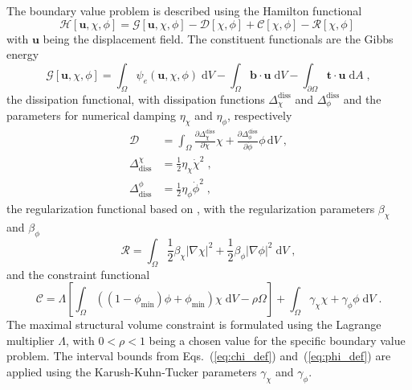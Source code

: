 \documentclass[
	pdflatex,
	sn-mathphys-num
]{sn-jnl}
\theoremstyle{thmstyleone}%
\theoremstyle{thmstyletwo}%
\theoremstyle{thmstylethree}%
\begin{document}
The boundary value problem is described using the Hamilton
functional
\begin{equation}
	\label{eq:hamiltonian}
	\mathcal{H}[\boldsymbol{u},\chi,\phi]
	=\mathcal{G}[\boldsymbol{u},\chi,\phi]
	-\mathcal{D}[\chi,\phi]
	+\mathcal{C}[\chi,\phi]
	-\mathcal{R}[\chi,\phi]\;
\end{equation}
with $\boldsymbol{u}$ being the displacement field. The constituent
functionals are the Gibbs energy
\begin{equation}
	\label{eq:gibbs_ene}
	\mathcal{G}[\boldsymbol{u},\chi,\phi]
	=\int_{\Omega}\psi_e(\boldsymbol{u},\chi,\phi)\;\mathrm{d}V
	-\int_{\Omega}\boldsymbol{b}\cdot\boldsymbol{u}\;\mathrm{d}V
	-\int_{\partial\Omega}\boldsymbol{t}\cdot\boldsymbol{u}\;\mathrm{d}A\;,
\end{equation}
the dissipation functional, with dissipation functions $\Delta_\chi^\mathrm{diss}$ and $\Delta_\phi^\mathrm{diss}$ and the parameters for numerical damping $\eta_\chi$ and $\eta_\phi$, respectively
\cite{jantos_evolutionary_2016}
\begin{align}
	\label{eq:D}
	\mathcal{D}               & =
	\int_{\Omega}
	\frac{\partial\Delta_\chi^\mathrm{diss}}
	{\partial\dot{\chi}}\chi
	+\frac{\partial\Delta_\phi^\mathrm{diss}}
	{\partial\dot{\phi}}\phi\,\mathrm{d}V\;,
	\\
	\label{eq:delta_diss_chi}
	\Delta^\chi_\mathrm{diss} & =
	\frac{1}{2}\eta_{\chi}\dot{\chi}^2\;,
	\\
	\label{eq:delta_diss_phi}
	\Delta^\phi_\mathrm{diss} & =
	\frac{1}{2}\eta_{\phi}\dot{\phi}^2\;,
\end{align}
the regularization functional based on
\cite{jantos_accurate_2019}, with the regularization parameters
$\beta_{\chi}$ and $\beta_{\phi}$
\begin{equation}
	\label{eq:R}
	\mathcal{R}
	=\int_{\Omega}
	\frac{1}{2}\beta_{\chi}|\nabla\chi|^2
	+\frac{1}{2}\beta_{\phi}|\nabla\phi|^2
	\;\mathrm{d}V\;,
\end{equation}
and the constraint functional
\begin{equation}
	\mathcal{C}=\Lambda \left[
	\int_{\Omega}
	((1-\phi_\mathrm{min})\phi+\phi_\mathrm{min})
	\chi\;\mathrm{d}V-\rho\Omega\right]
	+\int_{\Omega}\gamma_{\chi}\chi+\gamma_{\phi}\phi
	\;\mathrm{d}V\;.
	\label{eq:C}
\end{equation}
The maximal structural volume constraint is
formulated using the Lagrange multiplier $\Lambda$, with
$0 < \rho < 1$ being a chosen value for the specific boundary value problem.
The interval bounds from
Eqs.~(\ref{eq:chi_def}) and~(\ref{eq:phi_def}) are applied using the
Karush-Kuhn-Tucker parameters $\gamma_\chi$ and $\gamma_\phi$.
\end{document}
